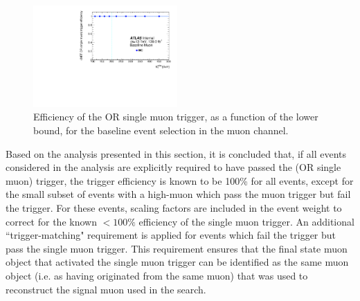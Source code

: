   \begin{figure}[htbp]
  \centering
     \includegraphics[width = 0.49\textwidth]{Figures/5/efficiency_baseline_muon_leptrig.pdf}
     \caption{Efficiency of the \met OR single muon trigger, as a function of the \met lower bound, for the baseline event selection in the muon channel.}
     \label{fig:trigger_OR}
  \end{figure}

Based on the analysis presented in this section, it is concluded that, if all events considered in the analysis are explicitly required to have passed the (\met OR single muon) trigger, the trigger efficiency is known to be 100\% for all events, except for the small subset of events with a high-\pt muon which pass the muon trigger but fail the \met trigger. For these events, scaling factors are included in the event weight to correct for the known \(<100\%\) efficiency of the single muon trigger. An additional ``trigger-matching" requirement is applied for events which fail the \met trigger but pass the single muon trigger. This requirement ensures that the final state muon object that activated the single muon trigger can be identified as the same muon object (i.e. as having originated from the same muon) that was used to reconstruct the signal muon used in the search. 
